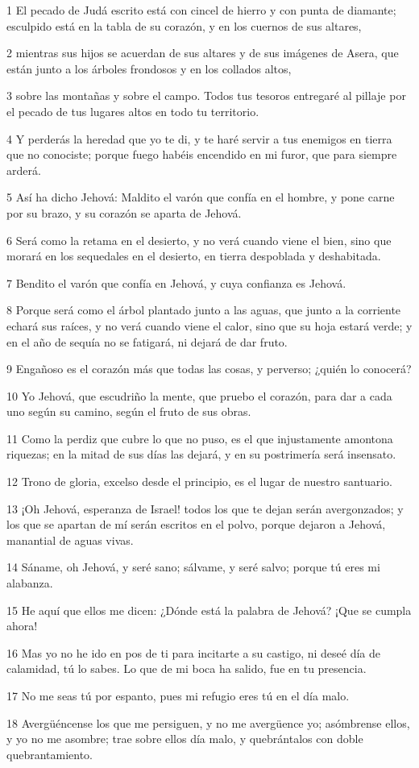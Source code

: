 \par 1 El pecado de Judá escrito está con cincel de hierro y con punta de diamante; esculpido está en la tabla de su corazón, y en los cuernos de sus altares,
\par 2 mientras sus hijos se acuerdan de sus altares y de sus imágenes de Asera, que están junto a los árboles frondosos y en los collados altos,
\par 3 sobre las montañas y sobre el campo. Todos tus tesoros entregaré al pillaje por el pecado de tus lugares altos en todo tu territorio.
\par 4 Y perderás la heredad que yo te di, y te haré servir a tus enemigos en tierra que no conociste; porque fuego habéis encendido en mi furor, que para siempre arderá.
\par 5 Así ha dicho Jehová: Maldito el varón que confía en el hombre, y pone carne por su brazo, y su corazón se aparta de Jehová.
\par 6 Será como la retama en el desierto, y no verá cuando viene el bien, sino que morará en los sequedales en el desierto, en tierra despoblada y deshabitada.
\par 7 Bendito el varón que confía en Jehová, y cuya confianza es Jehová.
\par 8 Porque será como el árbol plantado junto a las aguas, que junto a la corriente echará sus raíces, y no verá cuando viene el calor, sino que su hoja estará verde; y en el año de sequía no se fatigará, ni dejará de dar fruto.
\par 9 Engañoso es el corazón más que todas las cosas, y perverso; ¿quién lo conocerá?
\par 10 Yo Jehová, que escudriño la mente, que pruebo el corazón, para dar a cada uno según su camino, según el fruto de sus obras.
\par 11 Como la perdiz que cubre lo que no puso, es el que injustamente amontona riquezas; en la mitad de sus días las dejará, y en su postrimería será insensato.
\par 12 Trono de gloria, excelso desde el principio, es el lugar de nuestro santuario.
\par 13 ¡Oh Jehová, esperanza de Israel! todos los que te dejan serán avergonzados; y los que se apartan de mí serán escritos en el polvo, porque dejaron a Jehová, manantial de aguas vivas.
\par 14 Sáname, oh Jehová, y seré sano; sálvame, y seré salvo; porque tú eres mi alabanza.
\par 15 He aquí que ellos me dicen: ¿Dónde está la palabra de Jehová? ¡Que se cumpla ahora!
\par 16 Mas yo no he ido en pos de ti para incitarte a su castigo, ni deseé día de calamidad, tú lo sabes. Lo que de mi boca ha salido, fue en tu presencia.
\par 17 No me seas tú por espanto, pues mi refugio eres tú en el día malo.
\par 18 Avergüéncense los que me persiguen, y no me avergüence yo; asómbrense ellos, y yo no me asombre; trae sobre ellos día malo, y quebrántalos con doble quebrantamiento.

